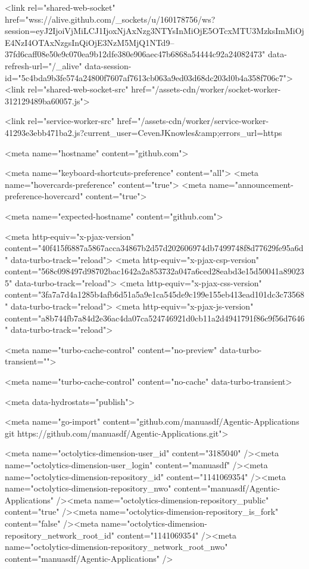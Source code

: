       <link rel="shared-web-socket" href="wss://alive.github.com/_sockets/u/160178756/ws?session=eyJ2IjoiVjMiLCJ1IjoxNjAxNzg3NTYsInMiOjE5OTcxMTU3MzksImMiOjE4NzI4OTAxNzgsInQiOjE3NzM5MjQ1NTd9--37fd6caff08e50e9c070ea9b12dfe380e906aec47b6868a54444c92a24082473" data-refresh-url="/_alive" data-session-id="5c4bda9b3fe574a24800f7607af7613cb063a9ed03d68dc203d0b4a358f706c7">
      <link rel="shared-web-socket-src" href="/assets-cdn/worker/socket-worker-312129489ba60057.js">

      <link rel="service-worker-src" href="/assets-cdn/worker/service-worker-41293e3ebb471ba2.js?current_user=CevenJKnowles&amp;errors_url=https%

      <meta name="hostname" content="github.com">


      <meta name="keyboard-shortcuts-preference" content="all">
      <meta name="hovercards-preference" content="true">
      <meta name="announcement-preference-hovercard" content="true">

        <meta name="expected-hostname" content="github.com">


  <meta http-equiv="x-pjax-version" content="40f415f6887a5867acca34867b2d57d202606974db7499748f8d77629fe95a6d" data-turbo-track="reload">
  <meta http-equiv="x-pjax-csp-version" content="568c098497d98702bac1642a2a853732a047a6ced28eabd3e15d50041a890235" data-turbo-track="reload">
  <meta http-equiv="x-pjax-css-version" content="3fa7a7d4a1285b4afb6d51a5a9e1ca545de9c199e155eb413ead101dc3c73568" data-turbo-track="reload">
  <meta http-equiv="x-pjax-js-version" content="a8b744fb7a84d2e36ac4da07ca524746921d0cb11a2d4941791f86c9f56d7646" data-turbo-track="reload">

  <meta name="turbo-cache-control" content="no-preview" data-turbo-transient="">

      <meta name="turbo-cache-control" content="no-cache" data-turbo-transient>

    <meta data-hydrostats="publish">

  <meta name="go-import" content="github.com/manuasdf/Agentic-Applications git https://github.com/manuasdf/Agentic-Applications.git">

  <meta name="octolytics-dimension-user_id" content="3185040" /><meta name="octolytics-dimension-user_login" content="manuasdf" /><meta name="octolytics-dimension-repository_id" content="1141069354" /><meta name="octolytics-dimension-repository_nwo" content="manuasdf/Agentic-Applications" /><meta name="octolytics-dimension-repository_public" content="true" /><meta name="octolytics-dimension-repository_is_fork" content="false" /><meta name="octolytics-dimension-repository_network_root_id" content="1141069354" /><meta name="octolytics-dimension-repository_network_root_nwo" content="manuasdf/Agentic-Applications" />



